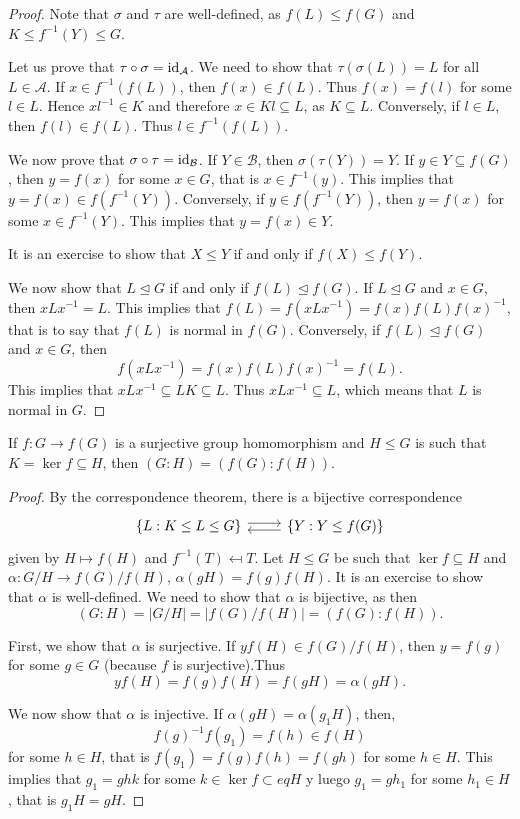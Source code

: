 \begin{proof}
    Note that $\sigma$ and $\tau$ are well-defined, as 
    $f(L)\leq f(G)$ and $K\leq f^{-1}(Y)\leq G$.

    Let us prove that $\tau\circ\sigma=\operatorname{id}_\mathcal{A}$. We need to show that $\tau(\sigma(L))=L$ for all $L\in\mathcal{A}$. If $x\in f^{-1}(f(L))$, then $f(x)\in f(L)$. Thus $f(x)=f(l)$ for some
    $l\in L$. Hence $xl^{-1}\in K$ and therefore 
    $x\in Kl\subseteq L$, as $K\subseteq L$.
    Conversely, if $l\in L$, then $f(l)\in f(L)$. Thus $l\in f^{-1}(f(L))$.

    We now prove that $\sigma\circ\tau=\operatorname{id}_\mathcal{B}$. If  $Y\in\mathcal{B}$, then $\sigma(\tau(Y))=Y$. If $y\in Y\subseteq f(G)$, then $y=f(x)$ for some $x\in G$, that is $x\in f^{-1}(y)$. This implies that $y=f(x)\in f(f^{-1}(Y))$. Conversely, if $y\in f(f^{-1}(Y))$, then $y=f(x)$ for some $x\in f^{-1}(Y)$. This implies that $y=f(x)\in Y$.

    It is an exercise to show that 
    $X\leq Y$ if and only if $f(X)\leq f(Y)$.

    We now show that $L\unlhd G$ if and only if 
    $f(L)\unlhd f(G)$. If $L\unlhd G$ and $x\in G$,
    then $xLx^{-1}=L$. This implies that $f(L)=f(xLx^{-1})=f(x)f(L)f(x)^{-1}$, that is
    to say that $f(L)$ is normal in $f(G)$. Conversely, if
    $f(L)\unlhd f(G)$ and $x\in G$, then 
        \[
        f(xLx^{-1})=f(x)f(L)f(x)^{-1}=f(L).
        \]
    This implies that $xLx^{-1}\subseteq LK\subseteq L$. Thus 
    $xLx^{-1}\subseteq L$, which means that $L$ is normal in $G$. 
\end{proof}

\begin{proposition}
    If $f\colon G\to f(G)$ is a surjective group homomorphism 
    and $H\leq G$ is such that $K=\ker f
\subseteq H$, then
        $(G:H)=(f(G):f(H))$.
\end{proposition}

\begin{proof}
By the correspondence theorem, 
there is a bijective correspondence 
\[
\begin{tikzcd}
        {\{L:K\leq L\leq G\}} & {\{Y:Y\leq f(G)\}}
        \arrow[shift left=1, from=1-1, to=1-2]
        \arrow[shift left=1, from=1-2, to=1-1]
\end{tikzcd}
\]
given by $H\mapsto f(H)$ and 
$f^{-1}(T)\mapsfrom T$. Let $H\leq G$ be such that
$\ker f\subseteq H$ and 
$\alpha\colon G/H\to f(G)/f(H)$, $\alpha(gH)=f(g)f(H)$.
It is an exercise to show that $\alpha$ is well-defined. 
We need to show that $\alpha$ is bijective, as then 
\[
(G:H)=|G/H|=|f(G)/f(H)|=(f(G):f(H)).
\]

First, we show that $\alpha$ is surjective. If $yf(H)\in f(G)/f(H)$, 
then
$y=f(g)$ for some $g\in G$ (because $f$ is surjective).Thus
\[
yf(H)=f(g)f(H)=f(gH)=\alpha(gH).
\]

We now show that $\alpha$ is injective. If $\alpha(gH)=\alpha(g_1H)$, then, 
\[
f(g)^{-1}f(g_1)=f(h)\in f(H)
\]
for some $h\in H$, that is 
$f(g_1)=f(g)f(h)=f(gh)$ for some $h\in H$. 
This implies that $g_1=ghk$ for some $k\in\ker f\subset
eq H$ y luego
$g_1=gh_1$ for some $h_1\in H$, that is $g_1H=gH$.
\end{proof}

